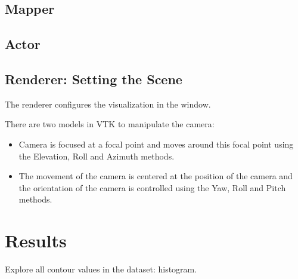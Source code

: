 \documentclass{article}
\begin{document}
\subsection{Mapper}

\subsection{Actor}


\subsection{Renderer: Setting the Scene}
The renderer configures the visualization in the window. 

There are two models in VTK to manipulate the camera:
\begin{itemize}
\item Camera is focused at a focal point and moves around this focal point using the Elevation, Roll and Azimuth methods.
\item The movement of the camera is centered at the position of the camera and the orientation of the camera is controlled using the Yaw, Roll and Pitch methods.
\end{itemize}


\section{Results}
Explore all contour values in the dataset: histogram. 
\end{document}
